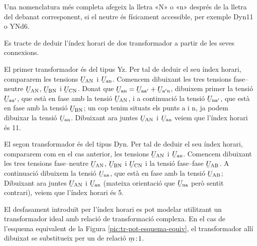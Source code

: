 Una nomenclatura més completa afegeix la lletra «N» o «n» després de la lletra del debanat corresponent, si el neutre és físicament accessible, per exemple Dyn11 o YNd6.

\begin{exemple}
    Es tracte de deduir l'índex horari de dos transformador a partir de les seves connexions.

    El primer transformador és del tipus Yz. Per tal de deduir el seu índex horari, compararem les tensions
    $\cmplx{U}\ped{AN}$ i $\cmplx{U}\ped{an}$. Comencem dibuixant les tres tensions fase--neutre $\cmplx{U}\ped{AN}$, $\cmplx{U}\ped{BN}$ i $\cmplx{U}\ped{CN}$. Donat que $\cmplx{U}\ped{an} = \cmplx{U}\ped{aa'} + \cmplx{U}\ped{a'n}$, dibuixem primer la tensió $\cmplx{U}\ped{aa'}$, que està en fase amb la tensió $\cmplx{U}\ped{AN}$, i a continuació la tensió $\cmplx{U}\ped{na'}$, que està en fase amb la tensió $\cmplx{U}\ped{BN}$; un cop tenim situats els punts a i n, ja podem dibuixar la tensió $\cmplx{U}\ped{an}$. Dibuixant ara juntes $\cmplx{U}\ped{AN}$ i $\cmplx{U}\ped{an}$  veiem que l'índex horari és 11.

    \begin{center}
        
    \end{center}

     El segon transformador és del tipus Dyn. Per tal de deduir el seu índex horari, compararem com en el cas anterior, les tensions $\cmplx{U}\ped{AN}$ i $\cmplx{U}\ped{an}$. Comencem dibuixant les tres tensions fase--neutre $\cmplx{U}\ped{AN}$, $\cmplx{U}\ped{BN}$ i $\cmplx{U}\ped{CN}$ i la tensió fase--fase $\cmplx{U}\ped{AB}$.  A continuació dibuixem la tensió $\cmplx{U}\ped{na}$, que està en fase amb la tensió $\cmplx{U}\ped{AB}$; Dibuixant ara juntes $\cmplx{U}\ped{AN}$ i $\cmplx{U}\ped{an}$ (mateixa orientació que $\cmplx{U}\ped{na}$ però sentit contrari),  veiem que l'índex horari és 5.

    \begin{center}
       
    \end{center}
\end{exemple}

El desfasament introduït per l'índex horari es pot modelar utilitzant  un transformador ideal amb relació de transformació complexa. En el cas de l'esquema equivalent de la Figura  \vref{pic:tr-pot-esquema-equiv}, el transformador allí dibuixat
se substitueix per un de relació $\cmplx{m}\!:\!1$.

